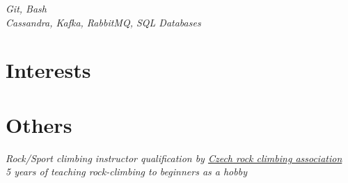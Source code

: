 \documentclass[10pt]{article} %
\begin{document}
{
\textit{Git, Bash} \\
\textit{Cassandra, Kafka, RabbitMQ, SQL Databases}
}



\section{Interests}




\section{Others}
{
\textit{Rock/Sport climbing instructor qualification by \href{https://www.horosvaz.cz/}{Czech rock climbing association}}\\
\textit{5 years of teaching rock-climbing to beginners as a hobby}
}

\end{document}
